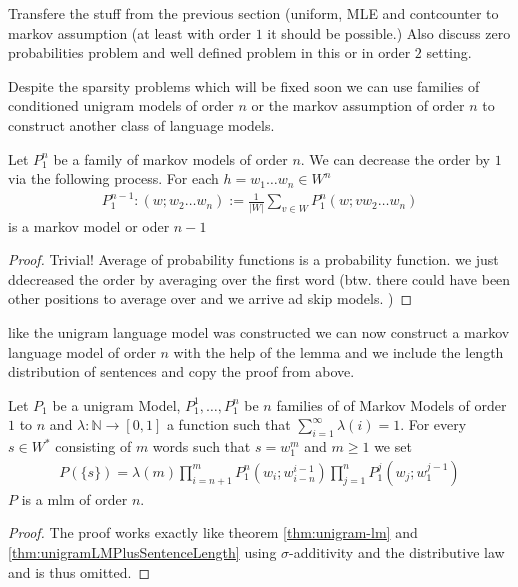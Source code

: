 \documentclass[•]{book}
\begin{document}
\begin{example}
Transfere the stuff from the previous section (uniform, MLE and contcounter to markov assumption (at least with order $1$ it should be possible.) Also discuss zero probabilities problem and well defined problem in this or in order $2$ setting. 
\end{example}
Despite the sparsity problems which will be fixed soon we can use families of conditioned unigram models of order $n$ or the markov assumption of order $n$ to construct another class of language models.  

\begin{lemma}\label{lem:constructLowerOrderMarkovFamilies}
Let $P_1^n$ be a family of markov models  of order $n$. We can decrease the order by $1$ via the following process. 
For each $h=w_1\dots w_n\in W^n$ 
\begin{align}
P_1^{n-1}:(w;w_2\dots w_n):=\frac{1}{|W|}\sum_{v\in W}P_1^n(w;v w_2\dots w_n)
\end{align}
is a markov model or oder $n-1$ 
\begin{proof}
Trivial!  Average of probability functions is a probability function. we just ddecreased the order by averaging over the first word (btw. there could have been other positions to average over and we arrive ad skip models. )
\end{proof}
\end{lemma}

like the unigram language model was constructed we can now construct a markov language model of order $n$ with the help of the lemma and we include the length distribution of sentences and copy the proof from above. 
\begin{theorem}\label{thm:markovModelOrderN}
Let $P_1$ be a unigram Model, $P_1^1,\dots,P_1^n$ be $n$ families of of Markov Models of order $1$ to $n$ and $\lambda:\mathbb{N}\longrightarrow [0,1]$ a function such that $\sum_{i=1}^\infty\lambda(i) = 1$. For every $s\in W^{*}$ consisting of $m$ words such that $s=w_1^m$  and $m\geq 1$ we set
\begin{align}
P(\{s\})=\lambda(m)\prod_{i=n+1}^mP_1^n(w_i;w_{i-n}^{i-1})\prod_{j=1}^nP_1^{j}(w_j;w_1^{j-1})\label{formula:MarkovLMOrderN}
\end{align}
$P$ is a \gls{mlm} of order $n$.
\begin{proof}
The proof works exactly like theorem \ref{thm:unigram-lm} and \ref{thm:unigramLMPlusSentenceLength} using $\sigma$-additivity and the distributive law and is thus omitted. 
\end{proof}
\end{theorem}
\end{document}
